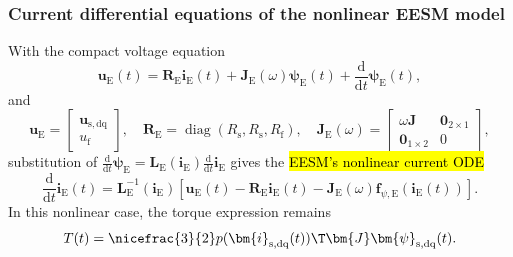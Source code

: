 \begin{frame}
    \frametitle{Current differential equations of the nonlinear EESM model}
    With the compact voltage equation
    \begin{equation}
        \bm{u}_\mathrm{E}(t) = \bm{R}_\mathrm{E}\bm{i}_\mathrm{E}(t) + \bm{J}_\mathrm{E}(\omega)\bm{\psi}_\mathrm{E}(t) + \frac{\mathrm{d}}{\mathrm{d}t}\bm{\psi}_\mathrm{E}(t),
    \end{equation}
    and
    \begin{equation}
        \bm{u}_\mathrm{E} = \begin{bmatrix} \bm{u}_\mathrm{s,dq} \\ u_\mathrm{f} \end{bmatrix},
        \quad
        \bm{R}_\mathrm{E} = \operatorname{diag}(R_\mathrm{s}, R_\mathrm{s}, R_\mathrm{f}),
        \quad
        \bm{J}_\mathrm{E}(\omega) = \begin{bmatrix}
            \omega\bm{J}       & \bm{0}_{2\times 1} \\
            \bm{0}_{1\times 2} & 0
        \end{bmatrix},
    \end{equation}\pause
    substitution of $\frac{\mathrm{d}}{\mathrm{d}t}\bm{\psi}_\mathrm{E} = \bm{L}_\mathrm{E}(\bm{i}_\mathrm{E})\frac{\mathrm{d}}{\mathrm{d}t}\bm{i}_\mathrm{E}$ gives the \hl{EESM's nonlinear current ODE}
    \begin{equation}
        \frac{\mathrm{d}}{\mathrm{d}t}\bm{i}_\mathrm{E}(t) = \bm{L}_\mathrm{E}^{-1}(\bm{i}_\mathrm{E})\left[\bm{u}_\mathrm{E}(t) - \bm{R}_\mathrm{E}\bm{i}_\mathrm{E}(t) - \bm{J}_\mathrm{E}(\omega)\bm{f}_{\psi,\mathrm{E}}(\bm{i}_\mathrm{E}(t))\right].
    \end{equation}\pause
    In this nonlinear case, the torque expression remains
    \begin{equation}
        T(t) = \nicefrac{3}{2} p (\bm{i}_\mathrm{s,dq}(t))\T\bm{J}\bm{\psi}_\mathrm{s,dq}(t).
    \end{equation}
\end{frame}

